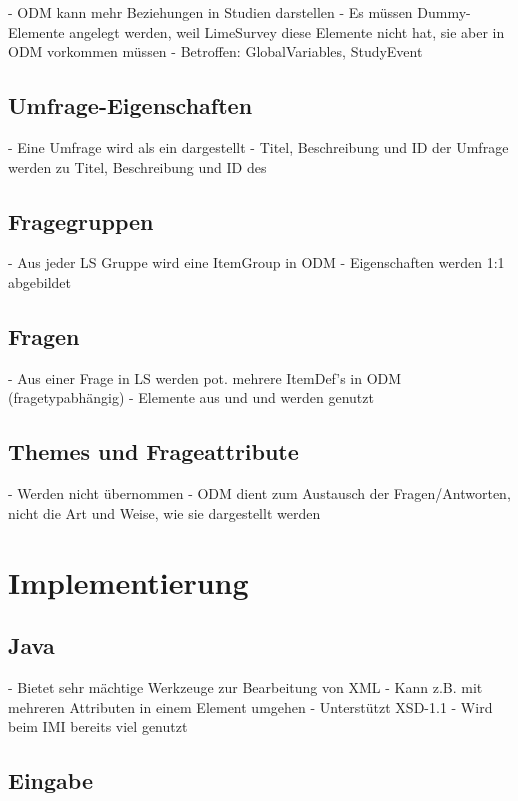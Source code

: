 - ODM kann mehr Beziehungen in Studien darstellen
- Es müssen Dummy-Elemente angelegt werden, weil LimeSurvey diese Elemente nicht hat, sie aber in ODM vorkommen müssen
- Betroffen: GlobalVariables, StudyEvent

\subsection{Umfrage-Eigenschaften}

- Eine Umfrage wird als ein  dargestellt
- Titel, Beschreibung und ID der Umfrage werden zu Titel, Beschreibung und ID des 

\subsection{Fragegruppen}

- Aus jeder LS Gruppe wird eine ItemGroup in ODM
- Eigenschaften werden 1:1 abgebildet

\subsection{Fragen}

- Aus einer Frage in LS werden pot. mehrere ItemDef's in ODM (fragetypabhängig)
- Elemente aus  und  und  werden genutzt

\subsection{Themes und Frageattribute}

- Werden nicht übernommen
	- ODM dient zum Austausch der Fragen/Antworten, nicht die Art und Weise, wie sie dargestellt werden

\section{Implementierung}

\subsection{Java}

- Bietet sehr mächtige Werkzeuge zur Bearbeitung von XML
	- Kann z.B. mit mehreren Attributen in einem Element umgehen
	- Unterstützt XSD-1.1
- Wird beim IMI bereits viel genutzt

\subsection{Eingabe}

